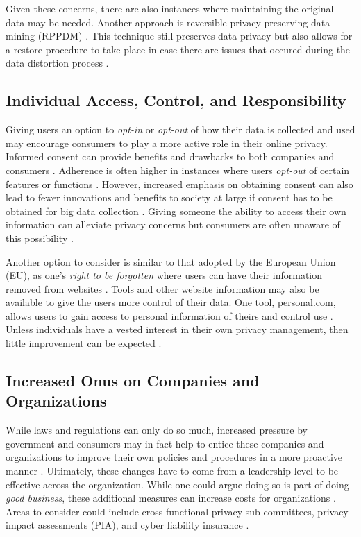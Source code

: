\documentclass[sigconf]{acmart}
\begin{document}
Given these concerns, there are also instances where maintaining the original data may be needed. Another approach is reversible privacy preserving data mining (RPPDM) \cite{Chen2013}. This technique still preserves data privacy but also allows for a restore procedure to take place in case there are issues that occured during the data distortion process \cite{Chen2013}. 

\subsection{Individual Access, Control, and Responsibility} 

Giving users an option to \textit{opt-in} or \textit{opt-out} of how their data is collected and used may encourage consumers to play a more active role in their online privacy. Informed consent can provide benefits and drawbacks to both companies and consumers \cite{Tene2012}. Adherence is often higher in instances where users \textit{opt-out} of certain features or functions \cite{Tene2013}. However, increased emphasis on obtaining consent can also lead to fewer innovations and benefits to society at large if consent has to be obtained for big data collection \cite{Tene2013}. Giving someone the ability to access their own information can alleviate privacy concerns but consumers are often unaware of this possibility \cite{Tene2012}.

Another option to consider is similar to that adopted by the European Union (EU), as one's \textit{right to be forgotten} where users can have their information removed from websites \cite{Francis2014}. Tools and other website information may also be available to give the users more control of their data. One tool, personal.com, allows users to gain access to personal information of theirs and control use \cite{Tene2013}. Unless individuals have a vested interest in their own privacy management, then little improvement can be expected \cite{Tene2012}. 

\subsection{Increased Onus on Companies and Organizations} 

While laws and regulations can only do so much, increased pressure by government and consumers may in fact help to entice these companies and organizations to improve their own policies and procedures in a more proactive manner \cite{Culnan2009}. Ultimately, these changes have to come from a leadership level to be effective across the organization. While one could argue doing so is part of doing \textit{good business}, these additional measures can increase costs for organizations \cite{Culnan2009}. Areas to consider could include cross-functional privacy sub-committees, privacy impact assessments (PIA), and cyber liability insurance \cite{Culnan2009}. 
\end{document}
